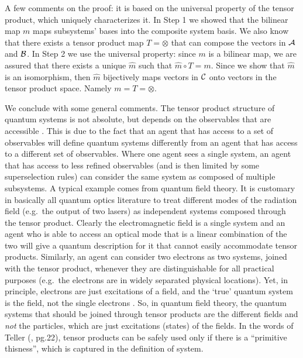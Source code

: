 \documentclass[aps,prl,amsmath,amssymb,twocolumn,nofootinbib]{revtex4}
\theoremstyle{plain}
\theoremstyle{definition}
\theoremstyle{remark}
\def\comment#1{ [{\bf Comment Lor:} {\sf #1}]}
\def\togli#1{}
\begin{document}
	\baselineskip A few comments on the proof: it is based on the
	universal property of the tensor product, which uniquely characterizes
	it. In Step 1 we showed that the bilinear map $m$ maps subsystems'
	bases into the composite system basis. We also know that there exists a
	tensor product map $ {T}=\otimes$ that can compose the vectors in $\cal A$
	and $\cal B$. In Step 2 we use the universal property: since $m$ is a
	bilinear map, we are assured that there exists a unique $\hat m$ such
	that $\hat m \circ T=m$. Since we show that $\hat m$ is an
	isomorphism, then $\hat{m}$ bijectively maps vectors in $\cal C$
	onto vectors in the tensor product space. Namely $m={T}=\otimes$.
	
	We conclude with some general comments. The tensor product structure
	of quantum systems is not absolute, but depends on the observables
	that are accessible \cite{zanardi,zanardilloyd}. This is due to the
	fact that an agent that has access to a set of observables will define
	quantum systems differently from an agent that has access to a
	different set of observables. Where one agent sees a single system, an
	agent that has access to less refined observables (and is then limited
	by some superselection rules) can consider the same system as composed
	of multiple subsystems. A typical example \cite{tellerbook} comes from
	quantum field theory. It is customary in basically all quantum optics
	literature to treat different modes of the radiation field (e.g.~the
	output of two lasers) as independent systems composed through the
	tensor product.  Clearly the electromagnetic field is a single system
	and an agent who is able to access an optical mode that is a linear
	combination of the two will give a quantum description for it that
	cannot easily accommodate tensor products. Similarly, an agent can
	consider two electrons as two systems, joined with the tensor product,
	whenever they are distinguishable for all practical purposes (e.g.~the
	electrons are in widely separated physical locations). Yet, in
	principle, electrons are just excitations of a field, and the `true'
	quantum system is the field, not the single electrons
	\cite{teller,tellerbook}.  So, in quantum field theory, the quantum
	systems that should be joined through tensor products are the
	different fields and {\em not} the particles, which are just
	excitations (states) of the fields. In the words of Teller
	(\cite{tellerbook}, pg.22), tensor products can be safely used only if
	there is a ``primitive thisness'', which is captured in the definition
	of system.\togli{\comment{forse e' da spiegare meglio}}
	
\end{document}
